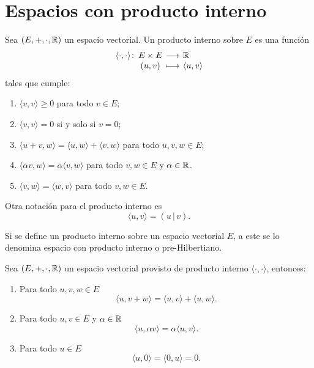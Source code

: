 \documentclass[a4,11pt]{aleph-notas}
\begin{document}
\encabezado


\section{Espacios con producto interno}

\begin{defi}
    Sea $(E,+,\cdot,\mathbb{R})$ un espacio vectorial. Un producto interno sobre $E$ es una función
    \[
        \funcion{\langle \cdot, \cdot \rangle}{E\times E}{\R}{(u,v)}{\langle u, v \rangle}
    \]
    tales que cumple:
    \begin{enumerate}
        \item 
            $\langle v, v \rangle \geq 0$ para todo $ v \in E$;
        \item 
            $\langle v,v \rangle = 0$ si y solo si $ v = 0$;
        \item 
            $\langle u + v, w \rangle = \langle u,w \rangle + \langle v,w\rangle $ para todo $u,v,w \in E$;
        \item
            $\langle \alpha v,w \rangle = \alpha \langle v,w \rangle$ para todo $v,w \in E$ y $\alpha\in\mathbb{R}$.
        \item
            $\langle v,w \rangle = \langle w, v \rangle$ para todo $v,w \in E$.
    \end{enumerate}
\end{defi}


\begin{advertencia}
    Otra notación para el producto interno es
    \[
        \langle u , v \rangle
        = (u\,|\,v).
    \]
\end{advertencia}


Si se define un producto interno sobre un espacio vectorial $E$, a este se lo denomina espacio con producto interno o pre-Hilbertiano. 

\begin{teo}
    Sea $(E,+,\cdot,\mathbb{R})$ un espacio vectorial provisto de producto interno $\langle \cdot, \cdot \rangle$, entonces:
    \begin{enumerate}
        \item 
            Para todo $u,v,w \in E$ 
            \[\langle u, v+w\rangle = \langle u,v\rangle + \langle u, w \rangle.\]
        \item 
            Para todo $u,v \in E$ y $\alpha \in \mathbb{R}$
            \[\langle u, \alpha v\rangle =  {\alpha}\langle u,v\rangle.\]
        \item
            Para todo $u\in E$ 
            \[\langle u, 0 \rangle =  \langle 0, u \rangle  = 0.\]
    \end{enumerate}
\end{teo}
\end{document}
